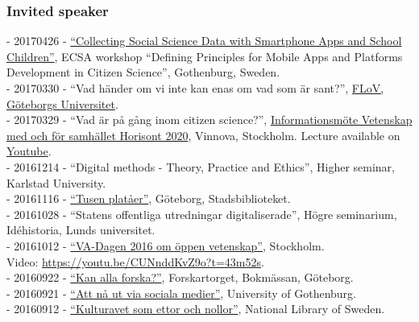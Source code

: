 \documentclass[a4paper,11pt,oneside]{article}
\begin{document}
    \subsubsection{Invited speaker}
    - 20170426 - \href{https://ecsa.citizen-science.net/sites/default/files/draft_agenda_second_workshop_appsplatforms.pdf}{``Collecting Social Science Data with Smartphone Apps and School Children''}, ECSA workshop ``Defining Principles for Mobile Apps and Platforms Development in Citizen Science'', Gothenburg, Sweden. \\
    - 20170330 - ``Vad händer om vi inte kan enas om vad som är sant?'', \href{http://flov.gu.se/aktuellt/Nyheter/fulltext//oppet-hus-pa-flov-med-panelsamtal-om-alternativa-fakta-och-informationsbubblor.cid1428426}{FLoV, Göteborgs Universitet}.\\
    - 20170329 - ``Vad är på gång inom citizen science?'', \href{http://www.vinnova.se/sv/Aktuellt--publicerat/Kalendarium/2017/170329-Informationsmote-Vetenskap-med-och-for-samhallet/}{Informationsmöte Vetenskap med och för samhället Horisont 2020}, Vinnova, Stockholm. Lecture available on \href{https://youtu.be/HHW0j7Zo5E0}{Youtube}.\\
    - 20161214 - ``Digital methods - Theory, Practice and Ethics'', Higher seminar, Karlstad University.\\
    - 20161116 - \href{http://www.stadsbiblioteket.nu/tusen-plataer/}{``Tusen platåer''}, Göteborg, Stadsbiblioteket.\\
    - 20161028 - ``Statens offentliga utredningar digitaliserade'', Högre seminarium, Idéhistoria, Lunds universitet.\\
    - 20161012 - \href{https://v-a.se/events/va-dagen-2016/}{``VA-Dagen 2016 om öppen vetenskap''}, Stockholm. \\Video: \href{https://youtu.be/CUNnddKvZ9o?t=43m52s}{https://youtu.be/CUNnddKvZ9o?t=43m52s}.\\
    - 20160922 - \href{http://flov.gu.se/aktuellt/Nyheter/fulltext//sju-filosofer-forelaser-pa-bokmassan-.cid1403852}{``Kan alla forska?''}, Forskartorget, Bokmässan, Göteborg. \\
    - 20160921 - \href{http://kompetensutveckling.adm.gu.se/seminar/detail/2260}{``Att nå ut via sociala medier''}, University of Gothenburg. \\
    - 20160912 - \href{http://www.kb.se/aktuellt/utbildningar/2016/Kulturarvet-som-ettor-och-nollor--Del-3-Digital-humaniora/}{``Kulturavet som ettor och nollor''}, National Library of Sweden.\\
\end{document}
